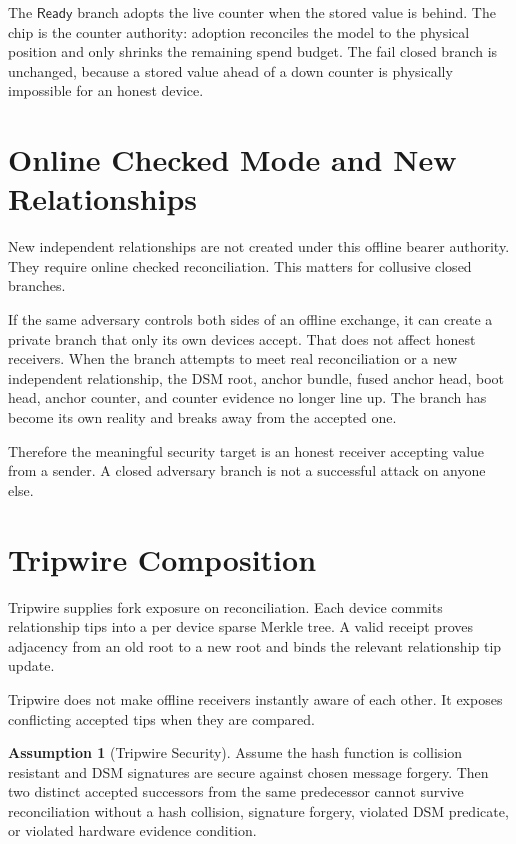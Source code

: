 \documentclass[11pt]{article}
\theoremstyle{definition}
\newtheorem{assumption}[theorem]{Assumption}
\theoremstyle{remark}
\newcommand{\Ready}{\ensuremath{\mathsf{Ready}}}
\begin{document}
The \(\Ready\) branch adopts the live counter when the stored value is behind. The chip is the
counter authority: adoption reconciles the model to the physical position and only shrinks the
remaining spend budget. The fail closed branch is unchanged, because a stored value ahead of a
down counter is physically impossible for an honest device.

\section{Online Checked Mode and New Relationships}

New independent relationships are not created under this offline bearer authority. They require
online checked reconciliation. This matters for collusive closed branches.

If the same adversary controls both sides of an offline exchange, it can create a private branch
that only its own devices accept. That does not affect honest receivers. When the branch attempts
to meet real reconciliation or a new independent relationship, the DSM root, anchor bundle, fused
anchor head, boot head, anchor counter, and counter evidence no longer line up. The branch has
become its own reality and breaks away from the accepted one.

Therefore the meaningful security target is an honest receiver accepting value from a sender. A
closed adversary branch is not a successful attack on anyone else.

\section{Tripwire Composition}

Tripwire supplies fork exposure on reconciliation. Each device commits relationship tips into a
per device sparse Merkle tree. A valid receipt proves adjacency from an old root to a new root and
binds the relevant relationship tip update.

Tripwire does not make offline receivers instantly aware of each other. It exposes conflicting
accepted tips when they are compared.

\begin{assumption}[Tripwire Security]
Assume the hash function is collision resistant and DSM signatures are secure against chosen
message forgery. Then two distinct accepted successors from the same predecessor cannot survive
reconciliation without a hash collision, signature forgery, violated DSM predicate, or violated
hardware evidence condition.
\end{assumption}
\end{document}
